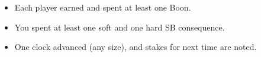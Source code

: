 \begin{tcolorbox}[title={Session 1 Done When},colback=gray!5,colframe=black]
\begin{itemize}
  \item Each player earned and spent at least one Boon.
  \item You spent at least one soft and one hard SB consequence.
  \item One clock advanced (any size), and stakes for next time are noted.
\end{itemize}
\end{tcolorbox}